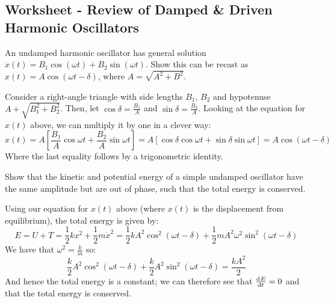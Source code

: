 \documentclass[../PHYS306Notes.tex]{subfiles}
\begin{document}
\subsection{Worksheet - Review of Damped \& Driven Harmonic Oscillators}
\begin{p}
An undamped harmonic oscillator has general solution $x(t) = B_1\cos(\omega t) + B_2\sin(\omega t)$. Show this can be recast as $x(t) = A\cos(\omega t - \delta)$, where $A = \sqrt{A^2 + B^2}$.
\end{p}
\begin{s}
Consider a right-angle triangle with side lengths $B_1$, $B_2$ and hypotenuse $A + \sqrt{B_1^2 + B_2^2}$. Then, let $\cos\delta = \frac{B_1}{A}$ and $\sin\delta = \frac{B_2}{A}$. Looking at the equation for $x(t)$ above, we can multiply it by one in a clever way:
\[x(t) = A\left[\frac{B_1}{A}\cos\omega t + \frac{B_2}{A}\sin\omega t\right] = A\left[\cos\delta\cos\omega t + \sin\delta \sin\omega t\right] = A\cos(\omega t - \delta)\]
Where the last equality follows by a trigonometric identity.
\end{s}

\begin{p}
Show that the kinetic and potential energy of a simple undamped oscillator have the same amplitude but are out of phase, such that the total energy is conserved. 
\end{p}
\begin{s}
Using our equation for $x(t)$ above (where $x(t)$ is the displacement from equilibrium), the total energy is given by:
\[E = U + T = \frac{1}{2}kx^2 + \frac{1}{2}m\dot{x}^2 = \frac{1}{2}kA^2\cos^2(\omega t - \delta) + \frac{1}{2}mA^2\omega^2\sin^2(\omega t - \delta)\]
We have that $\omega^2 = \frac{k}{m}$ so:
\[\frac{k}{2}A^2\cos^2(\omega t - \delta) + \frac{k}{2}A^2\sin^2(\omega t - \delta) = \frac{kA^2}{2}\]
And hence the total energy is a constant; we can therefore see that $\od{E}{t} = 0$ and that the total energy is conserved.
\end{s}
\end{document}
